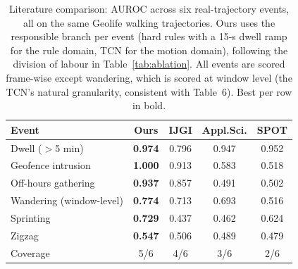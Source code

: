 \begin{table}[htbp]
\caption{Literature comparison: AUROC across six real-trajectory events, all on the same Geolife walking trajectories. Ours uses the responsible branch per event (hard rules with a 15-s dwell ramp for the rule domain, TCN for the motion domain), following the division of labour in Table~\ref{tab:ablation}. All events are scored frame-wise except wandering, which is scored at window level (the TCN's natural granularity, consistent with Table~6). Best per row in bold.}
\begin{center}
\begin{tabular}{lcccc}
\hline
\textbf{Event} & \textbf{Ours} & \textbf{IJGI\cite{ijgi}} & \textbf{Appl.Sci.\cite{applsci}} & \textbf{SPOT\cite{spot}} \\
\hline
Dwell ($>$5 min) & \textbf{0.974} & 0.796 & 0.947 & 0.952 \\
Geofence intrusion & \textbf{1.000} & 0.913 & 0.583 & 0.518 \\
Off-hours gathering & \textbf{0.937} & 0.857 & 0.491 & 0.502 \\
Wandering (window-level) & \textbf{0.774} & 0.713 & 0.693 & 0.516 \\
Sprinting & \textbf{0.729} & 0.437 & 0.462 & 0.624 \\
Zigzag & \textbf{0.547} & 0.506 & 0.489 & 0.479 \\
\hline
Coverage & 5/6 & 4/6 & 3/6 & 2/6 \\
\hline
\end{tabular}
\end{center}
\end{table}